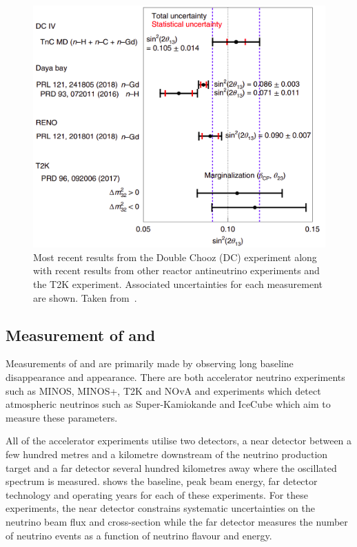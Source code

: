 \begin{figure}[h]
  \centering
  \includegraphics[width=.7\linewidth]{files/figures/theory/theta13Measurements}
  \caption[Results from the Double Chooz experiment along with recent results from other reactor antineutrino experiments and the T2K experiment.]{Most recent results from the Double Chooz (DC) experiment along with recent results from other reactor antineutrino experiments and the T2K experiment. Associated uncertainties for each measurement are shown. Taken from~\cite{dcIV}.}
  \label{fig:theta13Measurements}
\end{figure}

\subsection{Measurement of  and }
\label{sec:theory:currentState:lbl}

Measurements of  and  are primarily made by observing long baseline \numu disappearance and \nue appearance.
There are both accelerator neutrino experiments such as MINOS, MINOS+, T2K and NOvA and experiments which detect atmospheric neutrinos such as Super-Kamiokande and IceCube which aim to measure these parameters.

All of the accelerator experiments utilise two detectors, a near detector between a few hundred metres and a kilometre downstream of the neutrino production target and a far detector several hundred kilometres away where the oscillated spectrum is measured.
 shows the baseline, peak beam energy, far detector technology and operating years for each of these experiments.
For these experiments, the near detector constrains systematic uncertainties on the neutrino beam flux and cross-section while the far detector measures the number of neutrino events as a function of neutrino flavour and energy.

